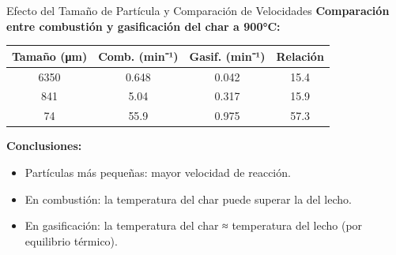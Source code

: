 \documentclass[../../main.tex]{subfiles}
\begin{document}
\begin{frame}{Efecto del Tamaño de Partícula y Comparación de Velocidades}
\small
\textbf{Comparación entre combustión y gasificación del char a 900°C:}

\vspace{0.5em}
\begin{tabular}{|c|c|c|c|}
\hline
\textbf{Tamaño (μm)} & \textbf{Comb. (min⁻¹)} & \textbf{Gasif. (min⁻¹)} & \textbf{Relación} \\
\hline
6350 & 0.648 & 0.042 & 15.4 \\
841  & 5.04  & 0.317 & 15.9 \\
74   & 55.9  & 0.975 & 57.3 \\
\hline
\end{tabular}

\vspace{0.5em}
\textbf{Conclusiones:}
\begin{itemize}
  \item Partículas más pequeñas: mayor velocidad de reacción.
  \item En combustión: la temperatura del char puede superar la del lecho.
  \item En gasificación: la temperatura del char ≈ temperatura del lecho (por equilibrio térmico).
\end{itemize}
\end{frame}
\end{document}
